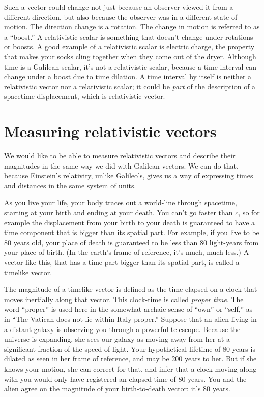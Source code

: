 Such a vector could change not just because an observer viewed it from a different direction, but also because
the observer was in a different state of motion. The direction change is a rotation. The change in motion is
referred to as a ``boost.'' A relativistic scalar is something that doesn't change under rotations or boosts.
A good example of a relativistic scalar is electric charge, the property that makes your socks cling together
when they come out of the dryer. Although time is a Galilean scalar, it's not a relativistic scalar, because
a time interval can change under a boost due to time dilation. A time interval by itself is neither a relativistic
vector nor a relativistic scalar; it could be \emph{part} of the description of a spacetime
displacement, which is relativistic vector.

\section{Measuring relativistic vectors}

We would like to be able to measure relativistic vectors and describe their magnitudes in the same way
we did with Galilean vectors. We can do that, because Einstein's relativity, unlike Galileo's, gives us
a way of expressing times and distances in the same system of units.

As you live your life, your body traces out a world-line through spacetime, starting at your birth and ending at your death.
You can't go faster than $c$, so for example the displacement from your birth to your death is guaranteed to have
a time component that is bigger than its spatial part. For example, if you live to be 80 years old, your place of
death is guaranteed to be less than 80 light-years from your place of birth. (In the earth's frame of reference,
it's much, much less.) A vector like this, that has a time part bigger than its spatial part, is called
a timelike vector.

The magnitude of a timelike vector is defined as the time elapsed on a clock that moves inertially along that
vector. This clock-time is called \emph{proper time}. The word ``proper'' is
used here in the somewhat archaic sense of ``own'' or ``self,'' as in ``The Vatican does not lie
within Italy proper.'' Suppose that an alien living in a distant galaxy is observing
you through a powerful telescope. Because the universe is expanding, she sees our galaxy as moving away from
her at a significant fraction of the speed of light. Your hypothetical lifetime of 80 years is dilated as seen
in her frame of reference, and may be 200 years to her. But if she knows your motion, she can correct for that,
and infer that a clock moving along with you would only have registered an elapsed time of 80 years. You and
the alien agree on the magnitude of your birth-to-death vector: it's 80 years.

